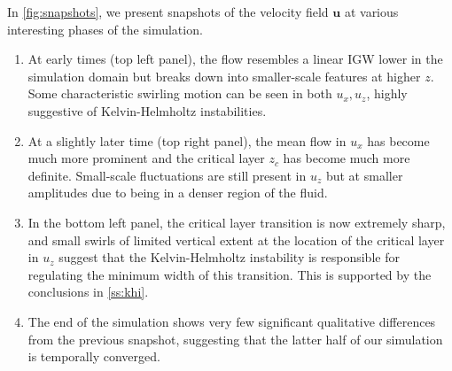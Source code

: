 \documentclass[
        fleqn,
        usenatbib,
    ]{mnras}
\newcommand*{\bm}[1]{\mathbf{#1}}
\begin{document}
In \autoref{fig:snapshots}, we present snapshots of the velocity field $\bm{u}$
at various interesting phases of the simulation.
\begin{enumerate}
    \item At early times (top left panel), the flow resembles a linear IGW lower
        in the simulation domain but breaks down into smaller-scale features at
        higher $z$. Some characteristic swirling motion can be seen in both
        $u_x, u_z$, highly suggestive of Kelvin-Helmholtz instabilities.

    \item At a slightly later time (top right panel), the mean flow in
        $u_x$ has become much more prominent and the critical layer $z_c$ has
        become much more definite. Small-scale fluctuations are still present in
        $u_z$ but at smaller amplitudes due to being in a denser region of the
        fluid.

    \item In the bottom left panel, the critical layer transition is now
        extremely sharp, and small swirls of limited vertical extent at the
        location of the critical layer in $u_z$ suggest that the
        Kelvin-Helmholtz instability is responsible for regulating the minimum
        width of this transition. This is supported by the conclusions in
        \autoref{ss:khi}.

    \item  The end of the simulation shows very few significant qualitative
        differences from the previous snapshot, suggesting that the latter half
        of our simulation is temporally converged.
\end{enumerate}
\end{document}

